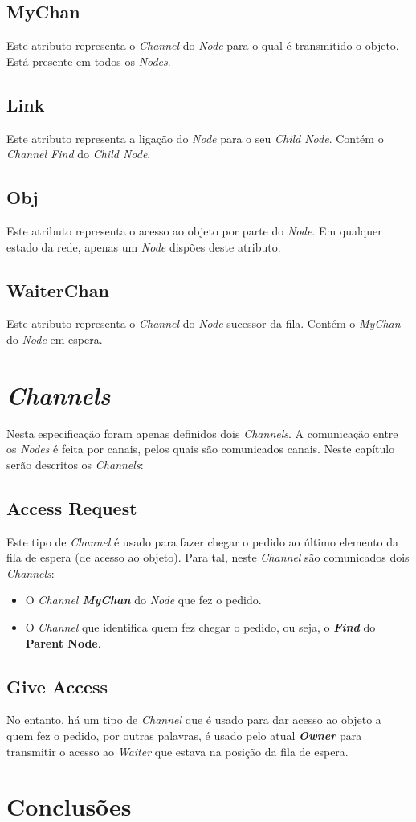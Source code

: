 \subsection*{MyChan}
\label{especificacao:atr:mychan}
    Este atributo representa o \emph{Channel} do \emph{Node} para o qual é transmitido o objeto.
    Está presente em todos os \emph{Nodes}.

\subsection*{Link}
\label{especificacao:atr:link}
    Este atributo representa a ligação do \emph{Node} para o seu \emph{Child Node}.
    Contém o \emph{Channel Find} do \emph{Child Node}.


\subsection*{Obj}
\label{especificacao:atr:obj}
    Este atributo representa o acesso ao objeto por parte do \emph{Node}.
    Em qualquer estado da rede, apenas um \emph{Node} dispões deste atributo.

\subsection*{WaiterChan}
\label{especificacao:atr:waiterchan}
    Este atributo representa o \emph{Channel} do \emph{Node} sucessor da fila.
    Contém o \emph{MyChan} do \emph{Node} em espera.


\section{\emph{Channels}}
\label{especificacao:sec:Channels}
Nesta especificação foram apenas definidos dois \emph{Channels}. A comunicação entre os \emph{Nodes} é feita por canais, pelos quais são comunicados canais.
Neste capítulo serão descritos os \emph{Channels}:


\subsection*{Access Request}
Este tipo de \emph{Channel} é usado para fazer chegar o pedido ao último elemento da fila de espera (de acesso ao objeto). 
Para tal, neste \emph{Channel} são comunicados dois \emph{Channels}:
\begin{itemize}
    \item O \emph{Channel \textbf{MyChan}} do \emph{Node} que fez o pedido.
    \item O \emph{Channel} que identifica quem fez chegar o pedido, ou seja, o \emph{\textbf{Find}} do \textbf{Parent Node}.
\end{itemize}


\subsection*{Give Access}
No entanto, há um tipo de \emph{Channel} que é usado para dar acesso ao objeto a quem fez o pedido, por outras palavras, é usado pelo atual \emph{\textbf{Owner}} para transmitir o acesso ao \emph{Waiter} que estava na posição da fila de espera.

\section{Conclusões}
